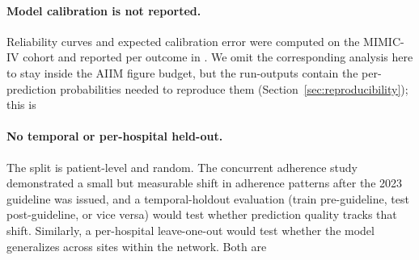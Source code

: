 \paragraph{Model calibration is not reported.}
Reliability curves and expected calibration error were computed on the
MIMIC-IV cohort and reported per outcome in
\citep{oded2026intervene}. We omit the corresponding analysis here to
stay inside the AIIM figure budget, but the run-outputs contain the
per-prediction probabilities needed to reproduce them
(Section~\ref{sec:reproducibility}); this is~

\paragraph{No temporal or per-hospital held-out.}
The split is patient-level and random. The concurrent adherence study
demonstrated a small but measurable shift in adherence patterns after
the 2023 guideline was issued, and a temporal-holdout evaluation
(train pre-guideline, test post-guideline, or vice versa) would test
whether prediction quality tracks that shift. Similarly, a per-hospital
leave-one-out would test whether the model generalizes across sites
within the network. Both are~
